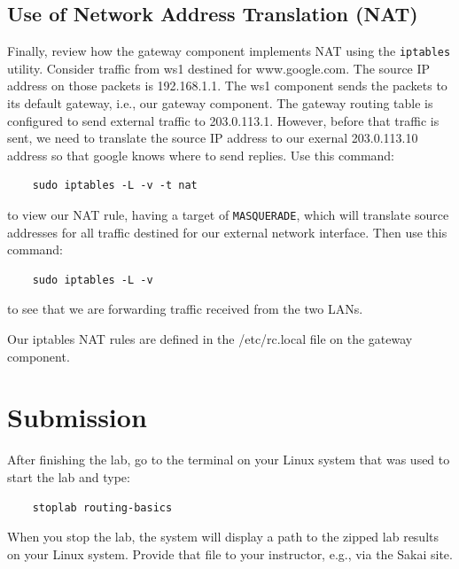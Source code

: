 \subsection{Use of Network Address Translation (NAT)}
Finally, review how the gateway component implements NAT using the \texttt{iptables}
utility.  Consider traffic from ws1 destined for www.google.com. The source IP address
on those packets is 192.168.1.1.  The ws1 component sends the packets to its default
gateway, i.e., our gateway component.  The gateway routing table is configured to
send external traffic to 203.0.113.1.  However, before that traffic is sent, we need
to translate the source IP address to our exernal 203.0.113.10 address so that google knows
where to send replies.
Use this command:
\begin{verbatim}
    sudo iptables -L -v -t nat
\end{verbatim}
\noindent to view our NAT rule, having a target of \texttt{MASQUERADE}, which will translate
source addresses for all traffic destined for our external network interface.  Then use
this command:
\begin{verbatim}
    sudo iptables -L -v
\end{verbatim}
\noindent to see that we are forwarding traffic received from the two LANs.

Our iptables NAT rules are defined in the /etc/rc.local file on the gateway component.

\section{Submission}
After finishing the lab, go to the terminal on your Linux system that was used to start the lab and type:
\begin{verbatim}
    stoplab routing-basics
\end{verbatim}
When you stop the lab, the system will display a path to the zipped lab results on your Linux system.  Provide that file to
your instructor, e.g., via the Sakai site.


